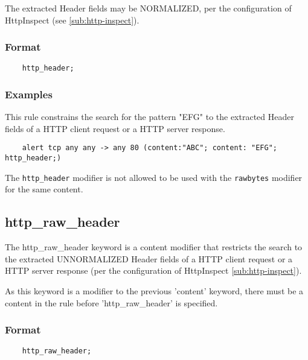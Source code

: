 \documentclass[english]{report}
\newenvironment{note}{
\samepage
    \vspace{10pt}{\textsf{
        {\hspace{7pt}\Huge{$\triangle$\hspace{-12.5pt}{\Large{$^!$}}}}\hspace{5pt}
        {\Large{NOTE}}
    }
    }
   \begin{center}
    \par\vspace{-17pt}

    \begin{lrbox}{\savepar}
    \begin{minipage}[r]{6in}
}
{
    \end{minipage}
    \end{lrbox}
    \fbox{
        \usebox{
            \savepar
	}
    }
    \par\vskip10pt
    \end{center}
}
\newenvironment{note}{
        \begin{rawhtml}
        <p><table border="1"><tr><td><b>
        Note:&nbsp;&nbsp;</b>
        \end{rawhtml}
}{
        \begin{rawhtml}
        </b></td></tr></table></p>
        \end{rawhtml}
}
\begin{document}
The extracted Header fields may be NORMALIZED, per the configuration of
HttpInspect (see \ref{sub:http-inspect}).

\subsubsection{Format}

\begin{verbatim}
    http_header;
\end{verbatim}

\subsubsection{Examples}

This rule constrains the search for the pattern "EFG" to the extracted Header
fields of a HTTP client request or a HTTP server response.

\begin{verbatim}
    alert tcp any any -> any 80 (content:"ABC"; content: "EFG"; http_header;)
\end{verbatim}

\begin{note}

The \texttt{http\_header} modifier is not allowed to be used with the
\texttt{rawbytes} modifier for the same content.

\end{note}

\subsection{http\_raw\_header}
\label{sub:RawHttpHeader}

The http\_raw\_header keyword is a content modifier that restricts the search to the
extracted UNNORMALIZED Header fields of a HTTP client request or a HTTP server
response (per the configuration of HttpInspect \ref{sub:http-inspect}).

As this keyword is a modifier to the previous 'content' keyword, there must be
a content in the rule before 'http\_raw\_header' is specified.

\subsubsection{Format}

\begin{verbatim}
    http_raw_header;
\end{verbatim}
\end{document}
